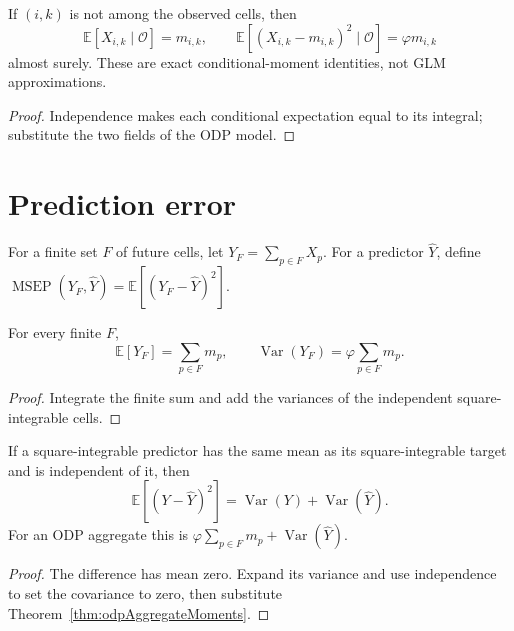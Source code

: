 \begin{theorem}\label{thm:odpConditionalMoments}\leanok
{}
If $(i,k)$ is not among the observed cells, then
\[
  \mathbb{E}[X_{i,k}\mid\mathcal{O}]=m_{i,k}, \qquad
  \mathbb{E}[(X_{i,k}-m_{i,k})^2\mid\mathcal{O}]=\varphi m_{i,k}
\]
almost surely. These are exact conditional-moment identities, not GLM approximations.
\end{theorem}
\begin{proof}\leanok Independence makes each conditional expectation equal to its integral;
substitute the two fields of the ODP model. \end{proof}

\section{Prediction error}

\begin{definition}\label{def:odpMsepExact}\leanok
For a finite set $F$ of future cells, let $Y_F=\sum_{p\in F}X_p$. For a predictor
$\widehat Y$, define $\operatorname{MSEP}(Y_F,\widehat Y)
=\mathbb{E}[(Y_F-\widehat Y)^2]$.
\end{definition}

\begin{theorem}\label{thm:odpAggregateMoments}\leanok
{}
For every finite $F$,
\[
  \mathbb{E}[Y_F]=\sum_{p\in F}m_p,
  \qquad
  \operatorname{Var}(Y_F)=\varphi\sum_{p\in F}m_p.
\]
\end{theorem}
\begin{proof}\leanok Integrate the finite sum and add the variances of the independent
square-integrable cells. \end{proof}

\begin{theorem}\label{thm:odpMsepExact}\leanok
{}
If a square-integrable predictor has the same mean as its square-integrable target and is
independent of it, then
\[
  \mathbb{E}[(Y-\widehat Y)^2]=\operatorname{Var}(Y)+\operatorname{Var}(\widehat Y).
\]
For an ODP aggregate this is
$\varphi\sum_{p\in F}m_p+\operatorname{Var}(\widehat Y)$.
\end{theorem}
\begin{proof}\leanok The difference has mean zero. Expand its variance and use independence to
set the covariance to zero, then substitute Theorem~\ref{thm:odpAggregateMoments}. \end{proof}

